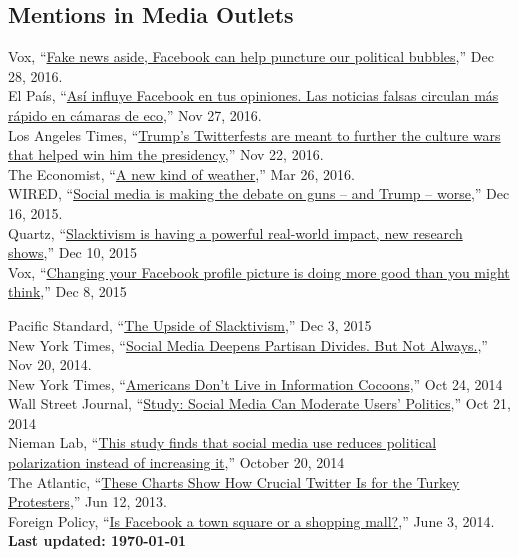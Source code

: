 \documentclass[margin,line,11pt]{resume}
\newcommand{\nl}{\vspace{0.10in}\\}
\begin{document}
\begin{resume}
                \section{\mysidestyle Mentions in Media Outlets}
Vox, ``\href{http://www.vox.com/the-big-idea/2016/12/28/14095452/fake-news-political-bubbles-democracy-facebook}{Fake news aside, Facebook can help puncture our political bubbles},'' Dec 28, 2016.\nl
El Pa\'{i}s, ``\href{http://internacional.elpais.com/internacional/2016/11/25/actualidad/1480095728_565471.html}{As\'{i} influye Facebook en tus opiniones. Las noticias falsas circulan m\'{a}s r\'{a}pido en c\'{a}maras de eco},'' Nov 27, 2016.\nl
Los Angeles Times, ``\href{http://www.latimes.com/politics/la-na-pol-trump-twitter-20161122-story.html}{Trump's Twitterfests are meant to further the culture wars that helped win him the presidency},'' Nov 22, 2016.\nl 
The Economist, ``\href{http://www.economist.com/news/special-report/21695192-social-media-now-play-key-role-collective-action-new-kind-weather}{A new kind of weather},'' Mar 26, 2016.\nl
WIRED, ``\href{http://www.wired.com/2015/12/social-media-is-making-the-debate-on-guns-and-trump-worse/}{Social media is making the debate on guns -- and Trump -- worse},'' Dec 16, 2015.\nl
Quartz, ``\href{http://qz.com/570009/slacktivism-is-having-a-powerful-real-world-impact-new-research-shows/}{Slacktivism is having a powerful real-world impact, new research shows},'' Dec 10, 2015\nl
Vox, ``\href{http://www.vox.com/2015/12/8/9873822/social-media-activism-science}{Changing your Facebook profile picture is doing more good than you might think},'' Dec 8, 2015\nl

\newpage

Pacific Standard, ``\href{https://psmag.com/the-upside-of-slacktivism-2a93294941b0#.hp2xyepdf}{The Upside of Slacktivism},'' Dec 3, 2015\nl
New York Times, ``\href{http://www.nytimes.com/2014/11/21/upshot/social-media-deepens-partisan-divides-but-not-always.html?_r=0}{Social Media Deepens Partisan Divides. But Not Always.},'' Nov 20, 2014.\nl
New York Times, ``\href{http://www.nytimes.com/2014/10/25/upshot/americans-dont-live-in-information-cocoons.html?_r=0}{Americans Don't Live in Information Cocoons},'' Oct 24, 2014\nl
Wall Street Journal, ``\href{http://blogs.wsj.com/washwire/2014/10/21/study-social-media-can-moderate-users-politics/}{Study: Social Media Can Moderate Users' Politics},'' Oct 21, 2014\nl
Nieman Lab, ``\href{http://www.niemanlab.org/2014/10/this-study-finds-that-social-media-use-reduces-political-polarization-instead-of-increasing-it/}{This study finds that social media use reduces political polarization instead of increasing it},'' October 20, 2014\nl
The Atlantic, ``\href{http://www.theatlantic.com/international/archive/2013/06/these-charts-show-how-crucial-twitter-is-for-the-turkey-protesters/276798/}{These Charts Show How Crucial Twitter Is for the Turkey Protesters},'' Jun 12, 2013.\nl
Foreign Policy, ``\href{http://foreignpolicy.com/2013/06/03/is-facebook-a-town-square-or-a-shopping-mall/}{Is Facebook a town square or a shopping mall?},'' June 3, 2014.\nl

\centering \textbf{Last updated: \today}
    


\end{resume}
\end{document}
